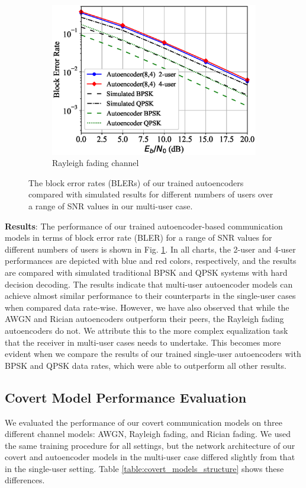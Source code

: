 \begin{figure}[tp!]
\begin{subfigure}{0.28\linewidth}
		\includegraphics[width=\linewidth]{figs/multi_autoencoder_bler_rayleigh}
		\caption{Rayleigh fading channel}	
	\end{subfigure}
	\caption{The block error rates (BLERs) of our trained autoencoders compared with simulated results for different numbers of users over a range of SNR values in our multi-user case.}
	\label{fig:multi_autoencoder_bler}
\end{figure}

\textbf{Results}: The performance of our trained autoencoder-based communication models in terms of block error rate (BLER) for a range of SNR values for different numbers of users is shown in Fig. \ref{fig:multi_autoencoder_bler}. In all charts, the 2-user and 4-user performances are depicted with blue and red colors, respectively, and the results are compared with simulated traditional BPSK and QPSK systems with hard decision decoding.
The results indicate that multi-user autoencoder models can achieve almost similar performance to their counterparts in the single-user cases when compared data rate-wise. However, we have also observed that while the AWGN and Rician autoencoders outperform their peers, the Rayleigh fading autoencoders do not. We attribute this to the more complex equalization task that the receiver in multi-user cases needs to undertake. This becomes more evident when we compare the results of our trained single-user autoencoders with BPSK and QPSK data rates, which were able to outperform all other results.

\subsection{Covert Model Performance Evaluation}
We evaluated the performance of our covert communication models on three different channel models: AWGN, Rayleigh fading, and Rician fading. We used the same training procedure for all settings, but the network architecture of our covert and autoencoder models in the multi-user case differed slightly from that in the single-user setting. Table \ref{table:covert_models_structure} shows these differences.

